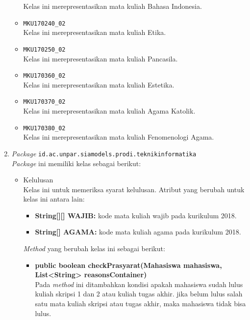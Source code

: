 \begin{enumerate}
\begin{itemize}
		Kelas ini merepresentasikan mata kuliah Bahasa Indonesia.
		\item \texttt{MKU170240\_02} \\
		Kelas ini merepresentasikan mata kuliah Etika.
		\item \texttt{MKU170250\_02} \\
		Kelas ini merepresentasikan mata kuliah Pancasila.
		\item \texttt{MKU170360\_02} \\
		Kelas ini merepresentasikan mata kuliah Estetika.
		\item \texttt{MKU170370\_02} \\
		Kelas ini merepresentasikan mata kuliah Agama Katolik.
		\item \texttt{MKU170380\_02} \\
		Kelas ini merepresentasikan mata kuliah Fenomenologi Agama.
	\end{itemize}
	\item \textit{Package} \texttt{id.ac.unpar.siamodels.prodi.teknikinformatika}\\
	\textit{Package} ini memiliki kelas sebagai berikut:
	\begin{itemize}
		\item Kelulusan\\
		Kelas ini untuk memeriksa syarat kelulusan. Atribut yang berubah untuk kelas ini antara lain:
		\begin{itemize}
			\item \textbf{String[][] WAJIB:} kode mata kuliah wajib pada kurikulum 2018.
			\item \textbf{String[] AGAMA:} kode mata kuliah agama pada kurikulum 2018.
		\end{itemize}
		\textit{Method} yang berubah kelas ini sebagai berikut:
		\begin{itemize}
			\item \textbf{public boolean checkPrasyarat(Mahasiswa mahasiswa, List<String> reasonsContainer)}\\
			Pada \textit{method} ini ditambahkan kondisi apakah mahasiswa sudah lulus kuliah skripsi 1 dan 2 atau kuliah tugas akhir. jika belum lulus salah satu mata kuliah skripsi atau tugas akhir, maka mahasiswa tidak bisa lulus.
		\end{itemize}
	\end{itemize}
	

\end{enumerate}
